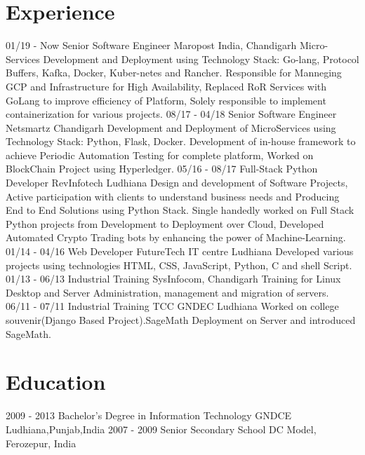 \documentclass[]{friggeri-cv}
\begin{document}
\section{Experience}
\begin{entrylist}
  \entry
    {01/19 - Now }
    {Senior Software Engineer}
    {Maropost India, Chandigarh}
    {Micro-Services Development and Deployment using Technology Stack: Go-lang, Protocol Buffers, Kafka, Docker, Kuber-netes and Rancher. Responsible for Manneging GCP and Infrastructure
    for High Availability, Replaced RoR Services with GoLang to improve efficiency of Platform, Solely responsible to implement containerization for various projects.}
   \entry
    {08/17 - 04/18}
    {Senior Software Engineer}
    {Netsmartz Chandigarh}
    {Development and Deployment of MicroServices using Technology Stack: Python, Flask, Docker. Development of in-house framework to achieve Periodic Automation Testing for complete platform,
    Worked on BlockChain Project using Hyperledger.}
  \entry
    {05/16 - 08/17}
    {Full-Stack Python Developer}
    {RevInfotech Ludhiana}
    {Design and development of Software Projects, Active participation with clients to understand business needs and Producing End to End Solutions using Python Stack. Single handedly worked on Full Stack
    Python projects from Development to Deployment over Cloud, Developed Automated Crypto Trading bots by enhancing the power of Machine-Learning.\\}
    \entry
    {01/14 - 04/16}
    {Web Developer}
    {FutureTech IT centre Ludhiana}
    {Developed various projects using technologies HTML, CSS, JavaScript, Python, C and shell Script.\\}
    \entry
    {01/13 - 06/13}
    {Industrial Training}
    {SysInfocom, Chandigarh}
    {Training for Linux Desktop and Server Administration, management and migration of servers.\\}
    \entry
    {06/11 - 07/11}
    {Industrial Training}
    {TCC GNDEC Ludhiana}
    {Worked on college souvenir(Django Based Project).SageMath Deployment on Server and introduced SageMath.\\}
\end{entrylist}
\section{Education}
\begin{entrylist}
  \entry
    {2009 - 2013}
    {Bachelor's Degree in Information Technology}
    {GNDCE Ludhiana,Punjab,India}
    {\emph{}}
  \entry
    {2007 - 2009}
    {Senior Secondary School}
    {DC Model, Ferozepur, India}
    {\emph{}}
\end{entrylist}
\end{document}
